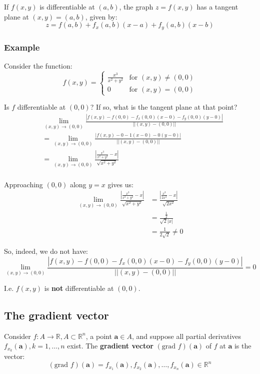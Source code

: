 \documentclass[11pt]{article}
\begin{document}
If \(f(x, y)\) is differentiable at \((a, b)\), the graph \(z = f(x, y)\) has a tangent plane at \((x, y) = (a, b)\), given by:
\[z = f(a, b) + f_x (a, b) (x - a) + f_y (a, b) (x - b)\]

\subsubsection{Example}
\label{sec:orgb1cfcd7}
Consider the function:
\[
f(x, y) = \begin{cases}
\frac{x^3}{x^2 + y^2} & \text{for } (x, y) \ne (0, 0) \\
0 & \text{for } (x, y) = (0, 0)
\end{cases}
\]

Is \(f\) differentiable at \((0, 0)\)? If so, what is the tangent plane at that point?
\begin{align*}
&\lim_{(x, y) \rightarrow (0, 0)} \frac{|f(x, y) - f(0, 0) - f_x(0, 0) (x - 0) - f_y(0, 0) (y - 0)|}{||(x, y) - (0, 0)||} \\
&= \lim_{(x, y) \rightarrow (0, 0)} \frac{|f(x, y) - 0 - 1 (x - 0) - 0 (y - 0)|}{||(x, y) - (0, 0)||} \\
&= \lim_{(x, y) \rightarrow (0, 0)} \frac{\left|\frac{x^3}{x^2 + y^2} - x \right|}{\sqrt{x^2 + y^2}} \\
\end{align*}

Approaching \((0, 0)\) along \(y = x\) gives us:
\begin{align*}
\lim_{(x, y) \rightarrow (0, 0)} \frac{\left|\frac{x^3}{x^2 + y^2} - x \right|}{\sqrt{x^2 + y^2}} &= \frac{\left| \frac{x^3}{2x^2} - x \right|}{\sqrt{2x^2}} \\
&= \frac{\frac{1}{2}}{\sqrt{2} |x|} \\
&= \frac{1}{2\sqrt{2}} \neq 0
\end{align*}

So, indeed, we do not have:
\[\lim_{(x, y) \rightarrow (0, 0)} \frac{|f(x, y) - f(0, 0) - f_x(0, 0) (x - 0) - f_y(0, 0) (y - 0)|}{||(x, y) - (0, 0)||} = 0\]

I.e. \(f(x ,y)\) is \textbf{not} differentiable at \((0, 0)\).

\subsection{The gradient vector}
\label{sec:org1aca6d5}
Consider \(f : A \rightarrow \mathbb{R}, A \subset \mathbb{R}^n\), a point \(\boldsymbol{a} \in A\), and suppose all partial derivatives \(f_{x_k}(\boldsymbol{a}), k = 1, \ldots, n\) exist. The \textbf{gradient vector} \((\text{grad } f)(\boldsymbol{a})\) of \(f\) at \(\boldsymbol{a}\) is the vector:
\[(\text{grad } f)(\boldsymbol{a}) = f_{x_1}(\boldsymbol{a}), f_{x_2}(\boldsymbol{a}), \ldots, f_{x_n}(\boldsymbol{a}) \in \mathbb{R}^n\]
\end{document}
